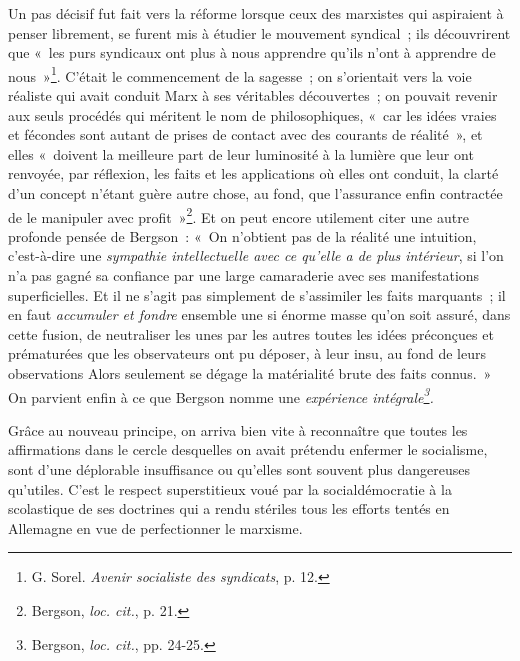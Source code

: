 \documentclass[french,twoside]{book} %
\begin{document}
Un pas décisif fut fait vers la réforme lorsque ceux des marxistes qui aspiraient à penser librement, se furent mis à étudier le mouvement syndical ; ils découvrirent que « les purs syndicaux ont plus à nous apprendre qu’ils n’ont à apprendre de nous »\footnote{ \noindent G. Sorel. \emph{Avenir socialiste des syndicats}, p. 12.
 }. C’était le commencement de la sagesse ; on s’orientait vers la voie réaliste qui avait conduit Marx à ses véritables découvertes ; on pouvait revenir aux seuls procédés qui méritent le nom de philosophiques, « car les idées vraies et fécondes sont autant de prises de contact avec des courants de réalité », et elles « doivent la meilleure part de leur luminosité à la lumière que leur ont renvoyée, par réflexion, les faits et les applications où elles ont conduit, la clarté d’un concept n’étant guère autre chose, au fond, que l’assurance enfin contractée de le manipuler avec profit »\footnote{ \noindent Bergson, \emph{loc. cit.}, p. 21.
 }. Et on peut encore utilement citer une autre profonde pensée de Bergson : « On n’obtient pas de la réalité une intuition, c’est-à-dire une \emph{sympathie intellectuelle avec ce qu’elle a de plus intérieur}, si l’on n’a pas gagné sa confiance par une large camaraderie avec ses manifestations superficielles. Et il ne s’agit pas simplement de s’assimiler les faits marquants ; il en faut \emph{accumuler et fondre} ensemble une si énorme masse qu’on  soit assuré, dans cette fusion, de neutraliser les unes par les autres toutes les idées préconçues et prématurées que les observateurs ont pu déposer, à leur insu, au fond de leurs observations Alors seulement se dégage la matérialité brute des faits connus. » On parvient enfin à ce que Bergson nomme une \emph{expérience intégrale\footnote{ \noindent Bergson, \emph{loc. cit.}, pp. 24-25.
 }.}\par
Grâce au nouveau principe, on arriva bien vite à reconnaître que toutes les affirmations dans le cercle desquelles on avait prétendu enfermer le socialisme, sont d’une déplorable insuffisance ou qu’elles sont souvent plus dangereuses qu’utiles. C’est le respect superstitieux voué par la socialdémocratie à la scolastique de ses doctrines qui a rendu stériles tous les efforts tentés en Allemagne en vue de perfectionner le marxisme.\par
\end{document}
